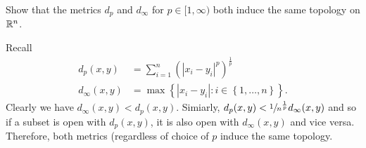 \begin{problem}
	Show that the metrics $d_p$ and $d_\infty$ for $p \in [1,\infty)$ both 
	induce the same topology on $\mathbb{R}^n$.
\end{problem}

\begin{solution}
	Recall
	\begin{align*}
		d_p(x,y)
			&= \sum_{i=1}^n \left( 
				\left\lvert x_i - y_i \right\rvert^p 
			\right)^{\frac1p} \\
		d_\infty(x,y)
			&= \max\left\{ 
				\left\lvert x_i - y_i \right\rvert: 
				i \in \left\{ 1, \ldots, n \right\}
			\right\}.
	\end{align*}
	Clearly we have $d_\infty(x,y) < d_p(x,y)$.
	Simiarly, $d_p(x,y) < \sfrac1{n^{\frac1p}} d_\infty(x,y)$ and so if a 
	subset is open with $d_p(x,y)$, it is also open with $d_\infty(x,y)$ and
	vice versa.
	Therefore, both metrics (regardless of choice of $p$ induce the same
	topology. 
\end{solution}
